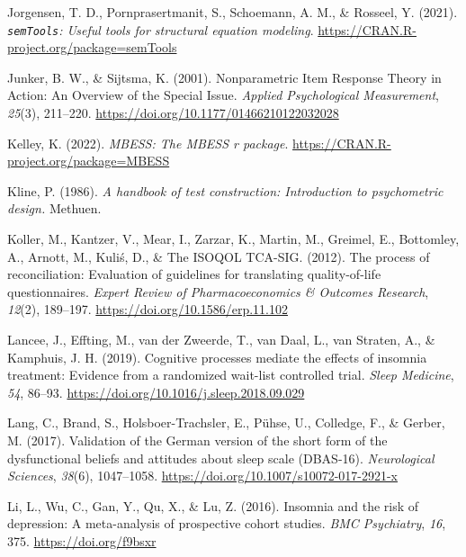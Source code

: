 \documentclass[
  ,doc,11pt, twoside,floatsintext]{apa6}
\newlength{\cslhangindent}
\newlength{\cslentryspacingunit} %
\newenvironment{CSLReferences}[2] %
 {%
  \setlength{\parindent}{0pt}
  \ifodd #1
  \let\oldpar\par
  \def\par{\hangindent=\cslhangindent\oldpar}
  \fi
  \setlength{\parskip}{#2\cslentryspacingunit}
 }%
 {}
\begin{document}
\begin{CSLReferences}{1}{0}
\leavevmode{}%
Jorgensen, T. D., Pornprasertmanit, S., Schoemann, A. M., \& Rosseel, Y. (2021). \emph{\texttt{semTools}: {U}seful tools for structural equation modeling}. \url{https://CRAN.R-project.org/package=semTools}

\leavevmode{}%
Junker, B. W., \& Sijtsma, K. (2001). Nonparametric {Item Response Theory} in {Action}: {An Overview} of the {Special Issue}. \emph{Applied Psychological Measurement}, \emph{25}(3), 211--220. \url{https://doi.org/10.1177/01466210122032028}

\leavevmode{}%
Kelley, K. (2022). \emph{MBESS: The MBESS r package}. \url{https://CRAN.R-project.org/package=MBESS}

\leavevmode{}%
Kline, P. (1986). \emph{A handbook of test construction: Introduction to psychometric design.} Methuen.

\leavevmode{}%
Koller, M., Kantzer, V., Mear, I., Zarzar, K., Martin, M., Greimel, E., Bottomley, A., Arnott, M., Kuliś, D., \& The ISOQOL TCA-SIG. (2012). The process of reconciliation: Evaluation of guidelines for translating quality-of-life questionnaires. \emph{Expert Review of Pharmacoeconomics \& Outcomes Research}, \emph{12}(2), 189--197. \url{https://doi.org/10.1586/erp.11.102}

\leavevmode{}%
Lancee, J., Effting, M., van der Zweerde, T., van Daal, L., van Straten, A., \& Kamphuis, J. H. (2019). Cognitive processes mediate the effects of insomnia treatment: Evidence from a randomized wait-list controlled trial. \emph{Sleep Medicine}, \emph{54}, 86--93. \url{https://doi.org/10.1016/j.sleep.2018.09.029}

\leavevmode{}%
Lang, C., Brand, S., Holsboer-Trachsler, E., Pühse, U., Colledge, F., \& Gerber, M. (2017). Validation of the {German} version of the short form of the dysfunctional beliefs and attitudes about sleep scale ({DBAS-16}). \emph{Neurological Sciences}, \emph{38}(6), 1047--1058. \url{https://doi.org/10.1007/s10072-017-2921-x}

\leavevmode{}%
Li, L., Wu, C., Gan, Y., Qu, X., \& Lu, Z. (2016). Insomnia and the risk of depression: A meta-analysis of prospective cohort studies. \emph{BMC Psychiatry}, \emph{16}, 375. \url{https://doi.org/f9bsxr}


\end{CSLReferences}
\end{document}
